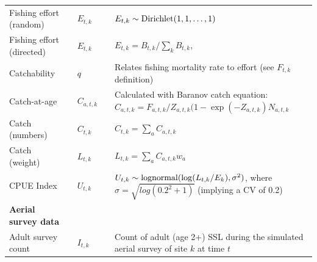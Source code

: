 \documentclass[nonumbib,leqno]{nrc1}
\begin{document}
\begin{longtable}{p{4cm}lll p{8cm}}
Fishing effort (random) & & $E_{t,k} $ & & $ E_{t,k} \sim {\rm Dirichlet}(1,1,\hdots,1)$ \\[2pt]

Fishing effort (directed) & & $E_{t,k}$ & & $ E_{t,k} = B_{t,k}/\sum_{k} B_{t,k} $, \newline \\[2pt]

Catchability & & $q$ & & Relates fishing mortality rate to effort (see $F_{t,k}$ definition) \\

Catch-at-age & & $C_{a,t,k}$ & & Calculated with Baranov catch equation: $C_{a,t,k}=F_{a,t,k}/Z_{a,t,k} (1-\exp(-Z_{a,t,k}) N_{a,t,k}$ \\ 

Catch (numbers) & & $C_{t,k}$ & & $C_{t,k}=\sum_a C_{a,t,k}$ \\

Catch (weight) & & $L_{t,k}$ & & $L_{t,k}=\sum_a C_{a,t,k} w_a$ \\

CPUE Index & & $U_{t,k}$ & & $U_{t,k} \sim {\rm lognormal}(\log(L_{t,k}/E_k),\sigma^2)$, where $\sigma=\sqrt{log(0.2^2+1)}$ (implying a CV of 0.2) \\

\midrule

\multicolumn{1}{l}{\textbf{Aerial survey data}}  \\
Adult survey count  & & $I_{t,k}$ & & Count of adult (age 2+) SSL during the simulated aerial survey of site $k$ at time $t$\\
\bottomrule
\end{longtable}
\end{document}

